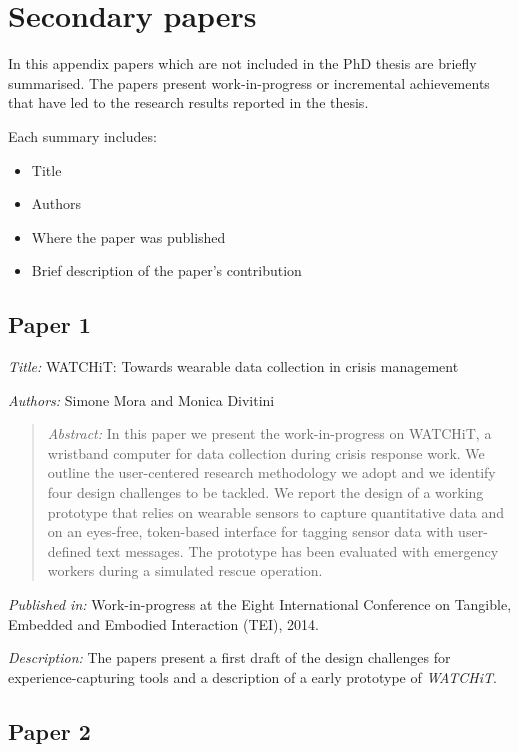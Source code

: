 \chapter{Secondary papers}
\label{secondary-papers}

In this appendix papers which are not included in the PhD thesis are briefly summarised. The papers present work-in-progress or incremental achievements that have led to the research results reported in the thesis.

Each summary includes:

\begin{itemize}
	\item Title
	\item Authors
	\item Where the paper was published
	\item Brief description of the paper's contribution
\end{itemize}

\section*{Paper 1}\label{secondary-papers}

\emph{Title: }WATCHiT: Towards wearable data collection in crisis management

\emph{Authors: }Simone Mora and Monica Divitini

\begin{quote}
	\emph{Abstract: }In this paper we present the work-in-progress on WATCHiT, a wristband computer for data collection during crisis response work. We outline the user-centered research methodology we adopt and we identify four design challenges to be tackled. We report the design of a working prototype that relies on wearable sensors to capture quantitative data and on an eyes-free, token-based interface for tagging sensor data with user-defined text messages. The prototype has been evaluated with emergency workers during a simulated rescue operation.
\end{quote}

\emph{Published in: }Work-in-progress at the Eight International Conference on Tangible, Embedded and Embodied Interaction (TEI), 2014.

\emph{Description: }The papers present a first draft of the design challenges for experience-capturing tools and a description of a early prototype of \emph{WATCHiT}. 

\section*{Paper 2}

